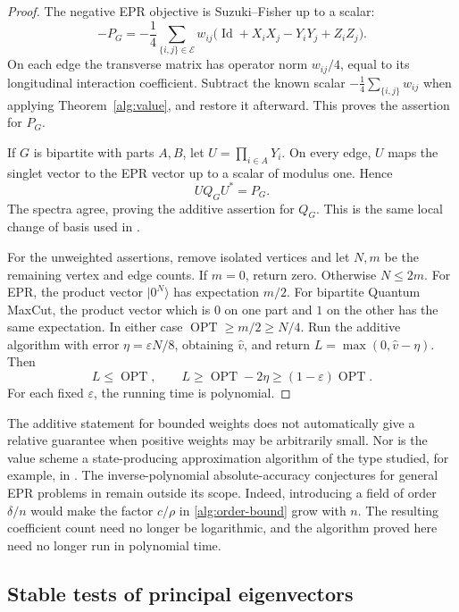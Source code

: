 \documentclass[reqno]{amsart}
\theoremstyle{definition}
\theoremstyle{remark}
\DeclareMathOperator{\Id}{Id}
\begin{document}
\begin{proof}
The negative EPR objective is Suzuki--Fisher up to a scalar:
\begin{equation}
 -P_G
  =-\frac14\sum_{\{i,j\}\in\mathcal E}w_{ij}
       \bigl(\Id+X_iX_j-Y_iY_j+Z_iZ_j\bigr).
 \label{alg:epr-expansion}
\end{equation}
On each edge the transverse matrix has operator norm
\(w_{ij}/4\), equal to its longitudinal interaction
coefficient.  Subtract the known scalar
\(-\frac14\sum_{\{i,j\}}w_{ij}\) when applying
Theorem~\ref{alg:value}, and restore it afterward.
This proves the assertion for \(P_G\).

If \(G\) is bipartite with parts \(A,B\), let
\(U=\prod_{i\in A}Y_i\).
On every edge, \(U\) maps the singlet vector to the EPR vector
up to a scalar of modulus one.  Hence
\[
 UQ_GU^*=P_G.
 \]
The spectra agree, proving the additive assertion for
\(Q_G\).  This is the same local change of basis used in
\cite[Corollary~2]{BGLW26}.

For the unweighted assertions, remove isolated vertices and let
\(N,m\) be the remaining vertex and edge counts. If \(m=0\), return
zero. Otherwise \(N\le2m\). For EPR, the product vector \(|0^N\rangle\)
has expectation \(m/2\). For bipartite Quantum MaxCut, the product
vector which is \(0\) on one part and \(1\) on the other has the same
expectation. In either case \(\operatorname{OPT}\ge m/2\ge N/4\).
Run the additive algorithm with error
\(\eta=\varepsilon N/8\), obtaining \(\widehat v\), and return
\(L=\max(0,\widehat v-\eta)\). Then
\[
 L\le\operatorname{OPT},\qquad
 L\ge\operatorname{OPT}-2\eta
   \ge(1-\varepsilon)\operatorname{OPT}.
\]
For each fixed \(\varepsilon\), the running time is polynomial.
\end{proof}

The additive statement for bounded weights does not automatically
give a relative guarantee when positive weights may be arbitrarily
small.  Nor is the value scheme a state-producing approximation
algorithm of the type studied, for example, in \cite{ALMPSS26}.
The inverse-polynomial absolute-accuracy conjectures for general
EPR problems in \cite{MarwahaSud26} remain outside its scope.
Indeed, introducing a field of order \(\delta/n\) would make
the factor \(c/\rho\) in \eqref{alg:order-bound} grow with \(n\).
The resulting coefficient count need no longer be logarithmic,
and the algorithm proved here need no longer run in polynomial
time.


\subsection{Stable tests of principal eigenvectors}
\label{alg:states-subsection}
\end{document}
